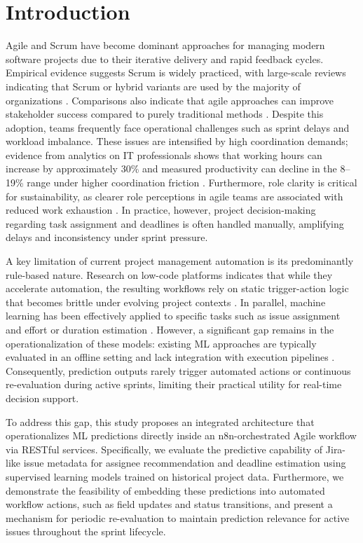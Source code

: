 \documentclass[conference]{IEEEtran}
\begin{document}
\section{Introduction}
Agile and Scrum have become dominant approaches for managing modern software projects due to their iterative delivery and rapid feedback cycles. Empirical evidence suggests Scrum is widely practiced, with large-scale reviews indicating that Scrum or hybrid variants are used by the majority of organizations \cite{verwijs2023_scrum}. Comparisons also indicate that agile approaches can improve stakeholder success compared to purely traditional methods \cite{gemino2021_project_success}. Despite this adoption, teams frequently face operational challenges such as sprint delays and workload imbalance. These issues are intensified by high coordination demands; evidence from analytics on IT professionals shows that working hours can increase by approximately 30\% and measured productivity can decline in the 8--19\% range under higher coordination friction \cite{gibbs2023_wfh_productivity}. Furthermore, role clarity is critical for sustainability, as clearer role perceptions in agile teams are associated with reduced work exhaustion \cite{venkatesh2020_work_exhaustion}. In practice, however, project decision-making regarding task assignment and deadlines is often handled manually, amplifying delays and inconsistency under sprint pressure.

A key limitation of current project management automation is its predominantly rule-based nature. Research on low-code platforms indicates that while they accelerate automation, the resulting workflows rely on static trigger-action logic that becomes brittle under evolving project contexts \cite{prinz2021_lowcode_slr, zhao2021_trigger_action}. In parallel, machine learning has been effectively applied to specific tasks such as issue assignment \cite{diamantopoulos2023_issue_assignment} and effort or duration estimation \cite{sousa2023_task_effort}. However, a significant gap remains in the operationalization of these models: existing ML approaches are typically evaluated in an offline setting \cite{mahdi2021_spm_slr, cabral2023_ensemble_effort} and lack integration with execution pipelines \cite{yasmin2024_airflow_wac}. Consequently, prediction outputs rarely trigger automated actions or continuous re-evaluation during active sprints, limiting their practical utility for real-time decision support.

To address this gap, this study proposes an integrated architecture that operationalizes ML predictions directly inside an n8n-orchestrated Agile workflow via RESTful services. Specifically, we evaluate the predictive capability of Jira-like issue metadata for assignee recommendation and deadline estimation using supervised learning models trained on historical project data. Furthermore, we demonstrate the feasibility of embedding these predictions into automated workflow actions, such as field updates and status transitions, and present a mechanism for periodic re-evaluation to maintain prediction relevance for active issues throughout the sprint lifecycle.
\end{document}
